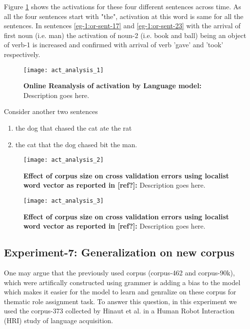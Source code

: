 {{Figure \ref{fig:act_analysis_1} shows the activations for these four different sentences across time. As all the four sentences start with "the", activation at this word is same for all the sentences. In sentences \ref{eg-1:or-sent-17} and \ref{eg-1:or-sent-23} with the arrival of first noun (i.e. man) the activation of noun-2 (i.e. book and ball) being an object of verb-1 is increased and confirmed with arrival of verb 'gave' and 'took' respectively.

\begin{figure}[hbtp]
\centering
\texttt{[image: act\_analysis\_1]}
\caption[Online Reanalysis of activation by Language model:]{\textbf{Online Reanalysis of activation by Language model:} Description goes here.}
\label{fig:act_analysis_1}
\end{figure}

Consider another two sentences 
\begin{enumerate}[noitemsep]
\item the dog that chased the cat ate the rat \label{eg-1:or-sent-17}
\item the cat that the dog chased bit the man. \label{eg-1:or-sent-23}
\end{enumerate}


\begin{figure}[hbtp]
\centering
\texttt{[image: act\_analysis\_2]}
\caption{\textbf{Effect of corpus size on cross validation errors using localist word vector as reported in [ref?]:} Description goes here.}
\label{fig:act_analysis_2}
\end{figure}

\begin{figure}[hbtp]
\centering
\texttt{[image: act\_analysis\_3]}
\caption{\textbf{Effect of corpus size on cross validation errors using localist word vector as reported in [ref?]:} Description goes here.}
\label{fig:act_analysis_3}
\end{figure}


\subsection{Experiment-7: Generalization on new corpus}

One may argue that the previously used corpus (corpus-462 and corpus-90k), which were artifically constructed using grammer is adding a bias to the model which makes it easier for the model to learn and genralize on these corpus for thematic role assignment task. To answer this question, in this experiment we used the corpus-373 collected by Hinaut et al. \cite{tra:tra:xavier_hri} in a Human Robot Interaction (HRI) study of language acquisition. 

}}
